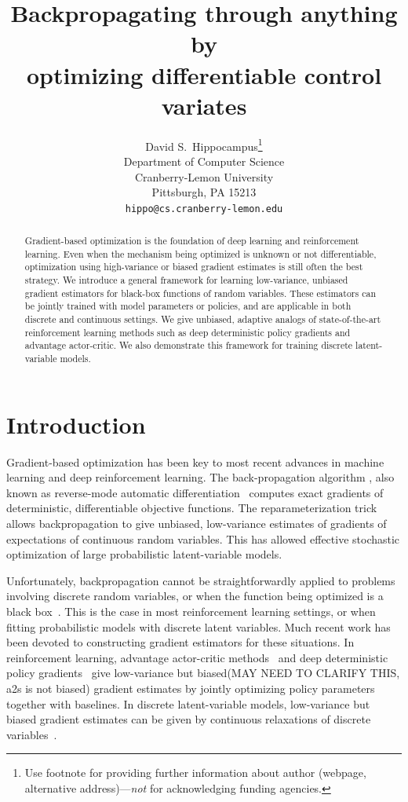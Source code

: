 \documentclass{article}
\title{Backpropagating through anything by\\ optimizing differentiable control variates}
\author{
  David S.~Hippocampus\thanks{Use footnote for providing further
    information about author (webpage, alternative
    address)---\emph{not} for acknowledging funding agencies.} \\
  Department of Computer Science\\
  Cranberry-Lemon University\\
  Pittsburgh, PA 15213 \\
  \texttt{hippo@cs.cranberry-lemon.edu} \\
}
\begin{document}
\maketitle
\begin{abstract}
Gradient-based optimization is the foundation of deep learning and reinforcement learning.
Even when the mechanism being optimized is unknown or not differentiable, optimization using high-variance or biased gradient estimates is still often the best strategy.
We introduce a general framework for learning low-variance, unbiased gradient estimators for black-box functions of random variables.
These estimators can be jointly trained with model parameters or policies, and are applicable in both discrete and continuous settings.
We give unbiased, adaptive analogs of state-of-the-art reinforcement learning methods such as deep deterministic policy gradients and advantage actor-critic.
We also demonstrate this framework for training discrete latent-variable models.
\end{abstract}


\section{Introduction}
Gradient-based optimization has been key to most recent advances in machine learning and deep reinforcement learning.
The back-propagation algorithm \citep{rumelhart1986learning}, also known as reverse-mode automatic differentiation~\citep{speelpenning1980compiling, rall1981automatic} computes exact gradients of deterministic, differentiable objective functions.
The reparameterization trick \citep{williams1992simple, kingma2013autoencoding, rezende2014stochastic} allows backpropagation to give unbiased, low-variance estimates of gradients of expectations of continuous random variables.
This has allowed effective stochastic optimization of large probabilistic latent-variable models.

Unfortunately, backpropagation cannot be straightforwardly applied to problems involving discrete random variables, or when the function being optimized is a black box~\citep{schulman2015gradient}.
This is the case in most reinforcement learning settings, or when fitting probabilistic models with discrete latent variables.
Much recent work has been devoted to constructing gradient estimators for these situations.
In reinforcement learning, advantage actor-critic methods~\citep{mnih2016asynchronous} and deep deterministic policy gradients~\citep{lillicrap2015continuous} give low-variance but biased(MAY NEED TO CLARIFY THIS, a2s is not biased) gradient estimates by jointly optimizing policy parameters together with baselines.
In discrete latent-variable models, low-variance but biased gradient estimates can be given by continuous relaxations of discrete variables~\citep{maddison2016concrete, jang2016categorical}.
\end{document}
